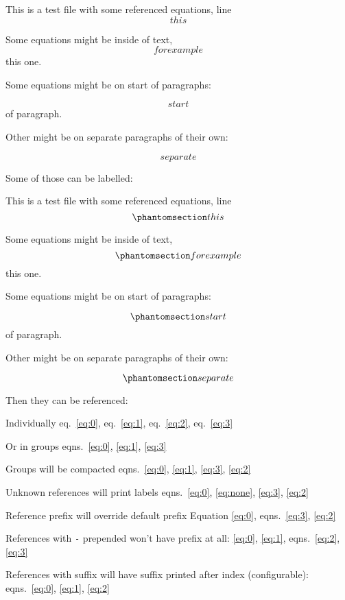 This is a test file with some referenced equations, line \[ this \]

Some equations might be inside of text, \[ for example \] this one.

Some equations might be on start of paragraphs:

\[ start \] of paragraph.

Other might be on separate paragraphs of their own:

\[ separate \]

Some of those can be labelled:

This is a test file with some referenced equations, line
\begin{equation}\phantomsection\label{eq:0}{ this }\label{eq:0}\end{equation}

Some equations might be inside of text,
\begin{equation}\phantomsection\label{eq:1}{ for example }\label{eq:1}\end{equation}
this one.

Some equations might be on start of paragraphs:

\begin{equation}\phantomsection\label{eq:2}{ start }\label{eq:2}\end{equation}
of paragraph.

Other might be on separate paragraphs of their own:

\begin{equation}\phantomsection\label{eq:3}{ separate }\label{eq:3}\end{equation}

Then they can be referenced:

Individually eq.~\ref{eq:0}, eq.~\ref{eq:1}, eq.~\ref{eq:2},
eq.~\ref{eq:3}

Or in groups eqns.~\ref{eq:0}, \ref{eq:1}, \ref{eq:3}

Groups will be compacted
eqns.~\ref{eq:0}, \ref{eq:1}, \ref{eq:3}, \ref{eq:2}

Unknown references will print labels
eqns.~\ref{eq:0}, \ref{eq:none}, \ref{eq:3}, \ref{eq:2}

Reference prefix will override default prefix Equation \ref{eq:0},
eqns.~\ref{eq:3}, \ref{eq:2}

References with \texttt{-} prepended won't have prefix at all:
\ref{eq:0}, \ref{eq:1}, eqns.~\ref{eq:2}, \ref{eq:3}

References with suffix will have suffix printed after index
(configurable): eqns.~\ref{eq:0}, \ref{eq:1}, \ref{eq:2}
